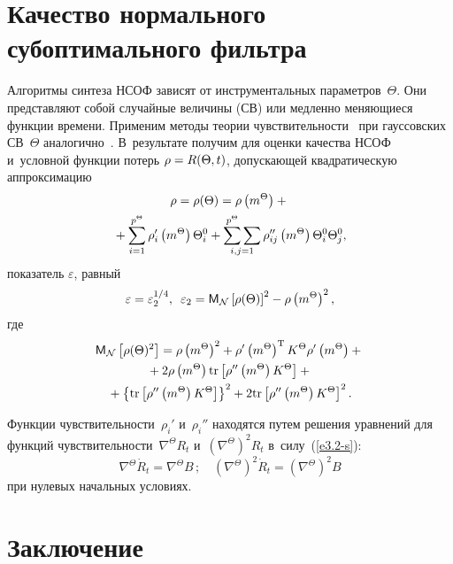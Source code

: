 \begin{multicols}{2}
\section{Качество нормального субоптимального фильтра}

Алгоритмы синтеза НСОФ зависят от инструментальных параметров~$\Theta$. 
Они представляют собой случайные величины (СВ) или медленно меняющиеся функции времени. 
Применим методы теории чувствительности~\cite{11-s, 12-s} при гауссовских СВ~$\Theta$  аналогично~\cite{8-s}. 
В~результате получим для оценки качества НСОФ и~условной функции потерь $\rho\hm= R(\Theta, t)$, допускающей квадратическую аппроксимацию
  \begin{multline*}
  \rho = \rho(\Theta) = \rho \left(m^\Theta\right) + {}\\
  {}+
    \sum\limits_{i=1}^{p^\Theta} \rho_i' \left(m^\Theta\right) \Theta_i^0 + 
      \mathop {\sum\limits^{p^\Theta}\sum\limits}_{i, j =1} \rho_{ij}'' \left(m^\Theta \right)\Theta_i^0\Theta_j^0, 
  \end{multline*}
показатель $\varepsilon$, равный
\begin{equation*}
  \varepsilon = \varepsilon_2^{1/4},\enskip \varepsilon_2 =\mathsf{M}_{\cal N} 
  \left[ \rho (\Theta)\right]^2 - \rho \left(m^\Theta\right)^2,
  \end{equation*}
где
\begin{multline*}
\mathsf{M}_{\cal N} \left[ \rho(\Theta)^2\right] = 
    \rho \left(m^\Theta\right)^2 + \rho' \left(m^\Theta\right)^{\mathrm{T}} K^\Theta \rho' \left(m^\Theta\right) + {}\\
    {}+
    2 \rho \left(m^\Theta\right) \mathrm{tr} \left[ \rho'' \left(m^\Theta\right) K^\Theta\right] +{}\\
{}+ \left\{ \mathrm{tr} \left[ \rho '' \left(m^\Theta\right) K^\Theta\right] \right\}^2 + 
2 \mathrm{tr} \left[ \rho'' \left(m^\Theta\right) K^\Theta\right]^2.
\end{multline*}

Функции чувствительности~$\rho_i'$ и~$\rho_i''$ находятся путем решения уравнений для функций 
чувствительности~$\nabla^\Theta R_t$ и~$(\nabla^\Theta)^2 R_t$ в~силу~(\ref{e3.2-s}):
    $$
    \nabla^\Theta \dot R_t= \nabla^\Theta B\,; \quad 
    \left(\nabla^\Theta\right)^2 \dot R_t=\left(\nabla^\Theta\right)^2 B %
    $$
при нулевых начальных условиях.

\vspace*{-6pt}

\section{Заключение}



\end{multicols}
